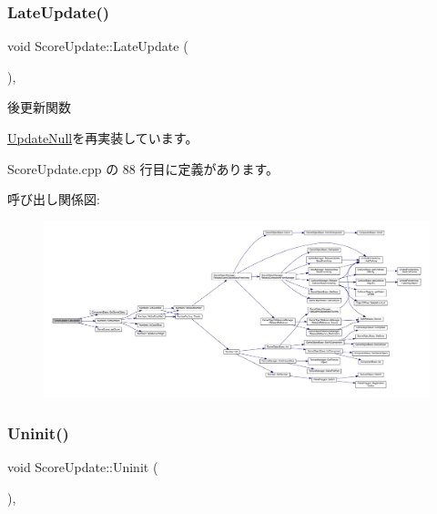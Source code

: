 \subsubsection{\texorpdfstring{Late\+Update()}{LateUpdate()}}
{\footnotesize\ttfamily void Score\+Update\+::\+Late\+Update (\begin{DoxyParamCaption}{ }\end{DoxyParamCaption})\hspace{0.3cm}{\ttfamily [override]}, {\ttfamily [virtual]}}



後更新関数 



\mbox{\hyperlink{class_update_null_ac68da1ba7f3fbcae833442bb1c169200}{Update\+Null}}を再実装しています。



 Score\+Update.\+cpp の 88 行目に定義があります。

呼び出し関係図\+:
\nopagebreak
\begin{figure}[H]
\begin{center}
\leavevmode
\includegraphics[width=350pt]{class_score_update_adc9a48f54828e49c072c298777935893_cgraph}
\end{center}
\end{figure}
\mbox{\label{class_score_update_a701d9c84c3ef92b1c54f33b37e23605f}} 
\subsubsection{\texorpdfstring{Uninit()}{Uninit()}}
{\footnotesize\ttfamily void Score\+Update\+::\+Uninit (\begin{DoxyParamCaption}{ }\end{DoxyParamCaption})\hspace{0.3cm}{\ttfamily [override]}, {\ttfamily [virtual]}}



